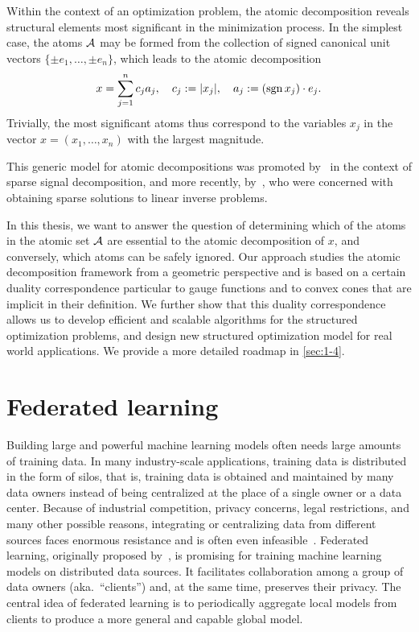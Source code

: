 Within the context of an optimization problem, the atomic decomposition reveals
structural elements most significant in the minimization process.
In the simplest case, the atoms $\mathcal{A}$ may be formed from the collection of
signed canonical unit vectors $\{\pm e_1,\ldots,\pm e_n\}$, which leads to the
atomic decomposition
\[
  x = \sum_{j=1}^n c_j a_j,
  \quad
  c_j: = |x_j|,
  \quad
  a_j:= (\operatorname{sgn} x_j)\cdot e_j.
\]
Trivially, the most significant atoms thus correspond to the variables $x_j$ in
the vector $x=(x_1,\ldots,x_n)$ with the largest magnitude.

This generic model for atomic decompositions was promoted by~\citet{cds98} in the context of sparse signal decomposition, and more recently, by~\citet{chandrasekaran2012convex}, who were concerned with obtaining sparse solutions to linear inverse problems. 

In this thesis, we want to answer the question of determining which of the atoms in the atomic set $\mathcal{A}$ are essential to the atomic decomposition of $x$, and conversely, which atoms can be safely ignored. Our approach studies the atomic decomposition framework from a geometric perspective and is based on a certain duality correspondence particular to gauge functions and to convex cones that are implicit in their definition. We further show that this duality correspondence allows us to develop efficient and scalable algorithms for the structured optimization problems, and design new structured optimization model for real world applications. We provide a more detailed roadmap in \autoref{sec:1-4}. 

\section{Federated learning} \label{sec:1-4}

Building large and powerful machine learning models often needs large amounts of training data. In many industry-scale applications, training data is distributed in the form of silos, that is, training data is obtained and maintained by many data owners instead of being centralized at the place of a single owner or a data center. Because of industrial competition, privacy concerns, legal restrictions, and many other possible reasons, integrating or centralizing data from different sources faces enormous resistance and is often even infeasible~\cite{li2020review}. Federated learning, originally proposed by~\citet{federated2016}, is promising for training machine learning models on distributed data sources. It facilitates collaboration among a group of data owners (aka.~``clients'') and, at the same time, preserves their privacy. The central idea of federated learning is to periodically aggregate local models from clients to produce a more general and capable global model.

